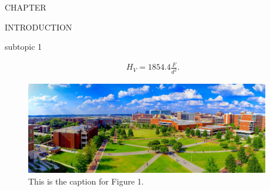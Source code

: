 
	\mainmatter 
	\pagestyle{plain}{
		\fancyhf{}
		\fancyhead[R]{\thepage}
	}
	

    \addtocounter{numch}{1}
    
    
	{\centering
		\vspace{0pt} \hspace{0pt} \par
	}
	{\centering
		\vspace{56pt} CHAPTER  \the\value{numch}
	}
	{\centering\singlespacing
		INTRODUCTION
	    \par
	}
	{\centering
		\vspace{0pt} \hspace{0pt} \par
	}
    \lipsum[1-5]
    
	{\centering
		\vspace{12pt}subtopic 1
	    \par
	}

\lipsum[2-4]
	\begin{equation}
		\begin{aligned}
		\label{eq}
			H_V = 1854.4\frac{F}{d^2}.
		\end{aligned}
	\end{equation}
\lipsum[2-4]

\lipsum[2-4]
    
    \begin{figure}[t]
        \centering
        \captionsetup{singlelinecheck = false, justification=justified}
        \includegraphics[width=0.95\textwidth]{UAB_Campus_Green.jpg}
        \caption[caption in contents of figures]{This is the caption for Figure 1.}
        \label{fig:1}
    \end{figure}
    
